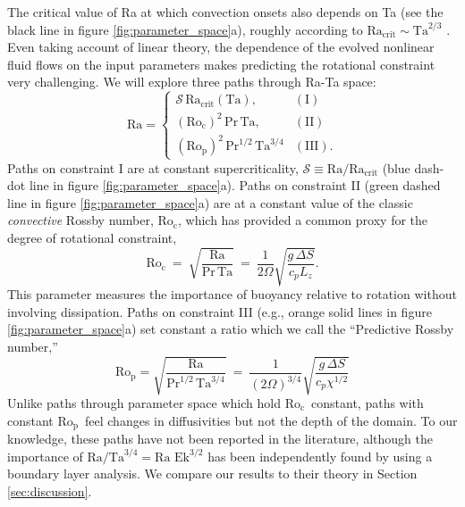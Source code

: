 \documentclass[twocolumn, amsmath, amsfonts, amssymb, trackchanges]{aastex62}
\newcommand{\pro}{\ensuremath{\text{Ro}_{\text{p}}}}
\newcommand{\con}{\ensuremath{\text{Ro}_{\text{c}}}}
\begin{document}
The critical value of Ra at which convection onsets also depends on Ta (see the black line in figure \ref{fig:parameter_space}a),
roughly according to $\text{Ra}_{\text{crit}} \sim \text{Ta}^{2/3}$ \citep{Chandrasekhar,calkins&all2015a}.
Even taking account of linear theory, the dependence of the evolved nonlinear fluid 
flows on the input parameters makes predicting the rotational constraint very challenging. 
We will explore three paths through Ra-Ta space:
\begin{equation}
    \text{Ra} = 
    \begin{cases}
    \mathcal{S}\,\text{Ra}_\text{crit}(\text{Ta}), & (\text{I})\\
    (\con)^2 \, \text{Pr}\, \text{Ta}, & (\text{II}) \\
    (\pro)^2\, \text{Pr}^{1/2}\, \text{Ta}^{3/4} & (\text{III}).
    \end{cases}
    \label{eqn:paths}
\end{equation}
Paths on constraint I are at constant supercriticality, 
$\mathcal{S} \equiv \text{Ra}/\text{Ra}_{\text{crit}}$
(blue dash-dot line in figure \ref{fig:parameter_space}a).
Paths on constraint II (green dashed line in figure \ref{fig:parameter_space}a)
are at a constant value of the classic
\textit{convective} Rossby number, \con, which has provided \citep[e.g., ][]{julien&all1996, brummell&all1996} 
a common proxy for the degree of rotational constraint,
\begin{equation}
\con \ = \   \sqrt{ \frac{\text{Ra}}{\text{Pr}\, \text{Ta} } } \ 
= \  \frac{1}{2 \Omega } \sqrt{\frac{g \, \Delta  S}{c_{p} L_{z}}}.
\end{equation}
This parameter measures the importance of buoyancy relative to rotation without 
involving dissipation.  
Paths on constraint
III (e.g., orange solid lines in figure \ref{fig:parameter_space}a) 
set constant a ratio which we call the ``Predictive Rossby number,'' 
\begin{equation}
\pro = \sqrt{\frac{\text{Ra}}{\text{Pr}^{1/2}\,\text{Ta}^{3/4}}} \ = \    
\frac{1}{(2 \Omega)^{3/4}} \sqrt{\frac{g \, \Delta  S}{c_{p} \chi^{1/2}}}
\end{equation}
Unlike paths through parameter space which hold \con$\,$ constant,
paths with constant \pro$\,$ 
feel changes in diffusivities but not the depth of the domain.
To our knowledge, these paths have not been reported in the literature, 
although the importance of $\text{Ra}/\text{Ta}^{3/4} = \text{Ra Ek}^{3/2}$
has been independently found by \cite{king&all2012} using a boundary layer
analysis. We compare our results to their theory in Section \ref{sec:discussion}. 
\end{document}
